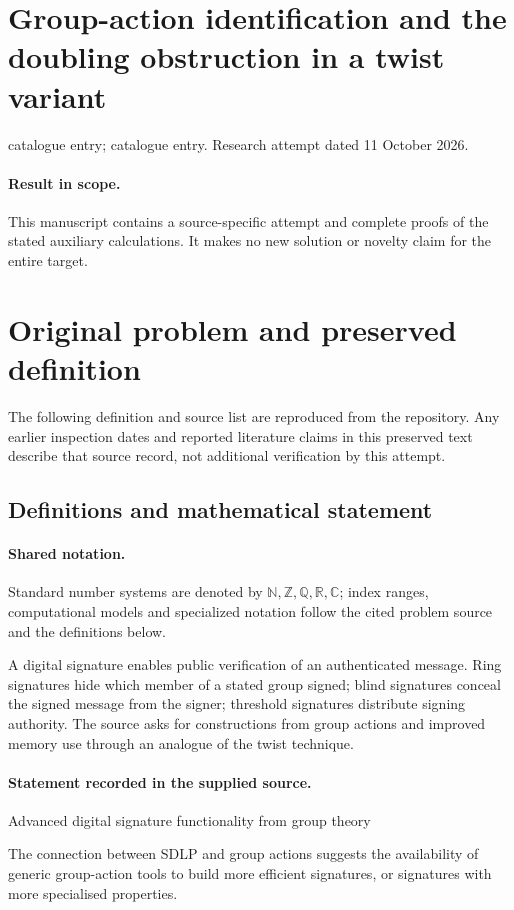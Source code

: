 \documentclass[11pt]{article}
\begin{document}
\section*{Group-action identification and the doubling obstruction in a twist variant}
\noindent catalogue entry; catalogue entry. Research attempt dated 11 October 2026.
\paragraph{Result in scope.}This manuscript contains a source-specific attempt and complete proofs of the stated auxiliary calculations. It makes no new solution or novelty claim for the entire target.
\section{Original problem and preserved definition}
The following definition and source list are reproduced from the repository. Any earlier inspection dates and reported literature claims in this preserved text describe that source record, not additional verification by this attempt.
\subsection{Definitions and mathematical statement}

\paragraph{Shared notation.}Standard number systems are denoted by $\mathbb N,\mathbb Z,\mathbb Q,\mathbb R,\mathbb C$; index ranges, computational models and specialized notation follow the cited problem source and the definitions below.


A digital signature enables public verification of an authenticated message. Ring signatures hide which member of a stated group signed; blind signatures conceal the signed message from the signer; threshold signatures distribute signing authority. The source asks for constructions from group actions and improved memory use through an analogue of the twist technique.
\paragraph{Statement recorded in the supplied source.}
Advanced digital signature functionality from group theory

The connection between SDLP and group actions suggests the availability of generic group-action tools to build more efficient signatures, or signatures with more specialised properties.
\end{document}
